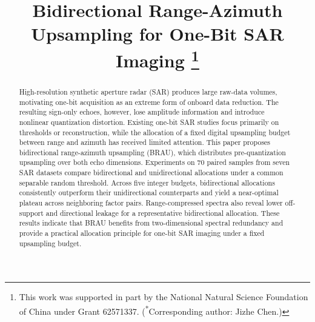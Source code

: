 \documentclass[conference]{IEEEtran}
\begin{document}
\title{Bidirectional Range-Azimuth Upsampling for One-Bit SAR Imaging
\thanks{This work was supported in part by the National Natural Science Foundation of China under Grant 62571337. (\textsuperscript{*}Corresponding author: Jizhe Chen.)}
}

\author{
\and
{}
\and
{}
}

\maketitle

\begin{abstract}
High-resolution synthetic aperture radar (SAR) produces large raw-data volumes, motivating one-bit acquisition as an extreme form of onboard data reduction. The resulting sign-only echoes, however, lose amplitude information and introduce nonlinear quantization distortion. Existing one-bit SAR studies focus primarily on thresholds or reconstruction, while the allocation of a fixed digital upsampling budget between range and azimuth has received limited attention. This paper proposes bidirectional range-azimuth upsampling (BRAU), which distributes pre-quantization upsampling over both echo dimensions. Experiments on 70 paired samples from seven SAR datasets compare bidirectional and unidirectional allocations under a common separable random threshold. Across five integer budgets, bidirectional allocations consistently outperform their unidirectional counterparts and yield a near-optimal plateau across neighboring factor pairs. Range-compressed spectra also reveal lower off-support and directional leakage for a representative bidirectional allocation. These results indicate that BRAU benefits from two-dimensional spectral redundancy and provide a practical allocation principle for one-bit SAR imaging under a fixed upsampling budget.
\end{abstract}
\end{document}
